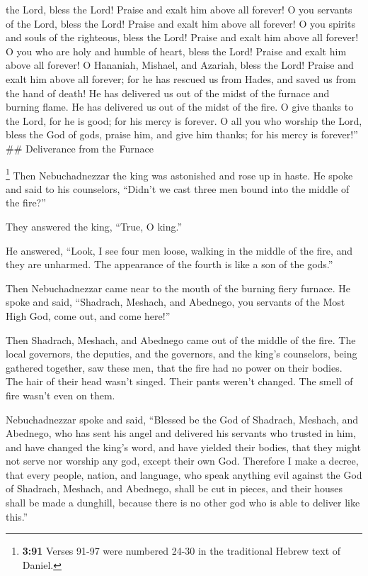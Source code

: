 the Lord, bless the Lord! Praise and exalt him above all forever!
 O you servants of the Lord, bless the Lord! Praise and
exalt him above all forever!  O you spirits and souls of
the righteous, bless the Lord! Praise and exalt him above all forever!
 O you who are holy and humble of heart, bless the Lord!
Praise and exalt him above all forever!  O Hananiah,
Mishael, and Azariah, bless the Lord! Praise and exalt him above all
forever; for he has rescued us from Hades, and saved us from the hand of
death! He has delivered us out of the midst of the furnace and burning
flame. He has delivered us out of the midst of the fire. 
O give thanks to the Lord, for he is good; for his mercy is forever.
 O all you who worship the Lord, bless the God of gods,
praise him, and give him thanks; for his mercy is forever!'' \#\#
Deliverance from the Furnace

 \footnote{\textbf{3:91} Verses 91-97 were numbered 24-30
  in the traditional Hebrew text of Daniel.} Then Nebuchadnezzar the
king was astonished and rose up in haste. He spoke and said to his
counselors, ``Didn't we cast three men bound into the middle of the
fire?''

They answered the king, ``True, O king.''

 He answered, ``Look, I see four men loose, walking in
the middle of the fire, and they are unharmed. The appearance of the
fourth is like a son of the gods.''

 Then Nebuchadnezzar came near to the mouth of the
burning fiery furnace. He spoke and said, ``Shadrach, Meshach, and
Abednego, you servants of the Most High God, come out, and come here!''

Then Shadrach, Meshach, and Abednego came out of the middle of the fire.
 The local governors, the deputies, and the governors,
and the king's counselors, being gathered together, saw these men, that
the fire had no power on their bodies. The hair of their head wasn't
singed. Their pants weren't changed. The smell of fire wasn't even on
them.

 Nebuchadnezzar spoke and said, ``Blessed be the God of
Shadrach, Meshach, and Abednego, who has sent his angel and delivered
his servants who trusted in him, and have changed the king's word, and
have yielded their bodies, that they might not serve nor worship any
god, except their own God.  Therefore I make a decree,
that every people, nation, and language, who speak anything evil against
the God of Shadrach, Meshach, and Abednego, shall be cut in pieces, and
their houses shall be made a dunghill, because there is no other god who
is able to deliver like this.''

